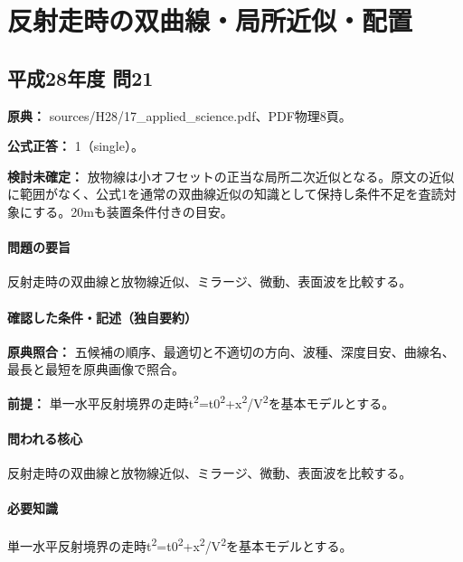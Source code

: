 \section{反射走時の双曲線・局所近似・配置}

\subsection{平成28年度 問21}
\label{q:h28-reg-applied-21}

\noindent\textbf{原典：} sources/H28/17\_applied\_science.pdf、PDF物理8頁。

\textbf{公式正答：} 1（single）。

\par\textbf{検討未確定：} 放物線は小オフセットの正当な局所二次近似となる。原文の近似に範囲がなく、公式1を通常の双曲線近似の知識として保持し条件不足を査読対象にする。20mも装置条件付きの目安。

\paragraph{問題の要旨} 反射走時の双曲線と放物線近似、ミラージ、微動、表面波を比較する。

\paragraph{確認した条件・記述（独自要約）}\mbox{}\par

\noindent\textbf{原典照合：} 五候補の順序、最適切と不適切の方向、波種、深度目安、曲線名、最長と最短を原典画像で照合。\par

\noindent\textbf{前提：} 単一水平反射境界の走時t\textsuperscript{2}=t0\textsuperscript{2}+x\textsuperscript{2}/V\textsuperscript{2}を基本モデルとする。\par

\paragraph{問われる核心} 反射走時の双曲線と放物線近似、ミラージ、微動、表面波を比較する。

\paragraph{必要知識} 単一水平反射境界の走時t\textsuperscript{2}=t0\textsuperscript{2}+x\textsuperscript{2}/V\textsuperscript{2}を基本モデルとする。

